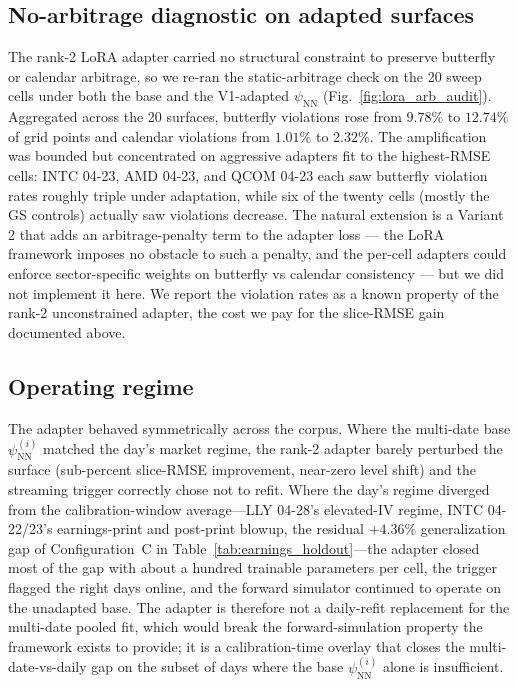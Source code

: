 \subsection{No-arbitrage diagnostic on adapted surfaces}\label{sec:lora_arb}

The rank-2 LoRA adapter carried no structural constraint to preserve butterfly or calendar arbitrage, so we re-ran the static-arbitrage check on the 20 sweep cells under both the base and the V1-adapted $\psi_{\text{NN}}$ (Fig.~\ref{fig:lora_arb_audit}). Aggregated across the 20 surfaces, butterfly violations rose from $9.78\%$ to $12.74\%$ of grid points and calendar violations from $1.01\%$ to $2.32\%$. The amplification was bounded but concentrated on aggressive adapters fit to the highest-RMSE cells: INTC 04-23, AMD 04-23, and QCOM 04-23 each saw butterfly violation rates roughly triple under adaptation, while six of the twenty cells (mostly the GS controls) actually saw violations decrease. The natural extension is a Variant 2 that adds an arbitrage-penalty term to the adapter loss --- the LoRA framework imposes no obstacle to such a penalty, and the per-cell adapters could enforce sector-specific weights on butterfly vs calendar consistency --- but we did not implement it here. We report the violation rates as a known property of the rank-2 unconstrained adapter, the cost we pay for the slice-RMSE gain documented above.

\subsection{Operating regime}\label{sec:lora_regime}

The adapter behaved symmetrically across the corpus. Where the multi-date base $\psi_{\text{NN}}^{(i)}$ matched the day's market regime, the rank-2 adapter barely perturbed the surface (sub-percent slice-RMSE improvement, near-zero level shift) and the streaming trigger correctly chose not to refit. Where the day's regime diverged from the calibration-window average---LLY 04-28's elevated-IV regime, INTC 04-22/23's earnings-print and post-print blowup, the residual $+4.36\%$ generalization gap of Configuration~C in Table~\ref{tab:earnings_holdout}---the adapter closed most of the gap with about a hundred trainable parameters per cell, the trigger flagged the right days online, and the forward simulator continued to operate on the unadapted base. The adapter is therefore not a daily-refit replacement for the multi-date pooled fit, which would break the forward-simulation property the framework exists to provide; it is a calibration-time overlay that closes the multi-date-vs-daily gap on the subset of days where the base $\psi_{\text{NN}}^{(i)}$ alone is insufficient.
